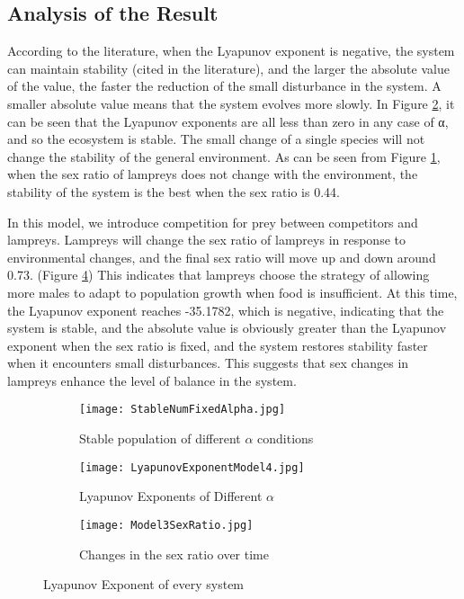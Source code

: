 \documentclass[12pt]{article}  %
\begin{document}
\subsection{Analysis of the Result}
According to the literature, when the Lyapunov exponent is negative, the system can maintain stability (cited in the literature), and the larger the absolute value of the value, the faster the reduction of the small disturbance in the system. A smaller absolute value means that the system evolves more slowly. In Figure \ref{LyapunovExponentModel4}, it can be seen that the Lyapunov exponents are all less than zero in any case of α, and so the ecosystem is stable. The small change of a single species will not change the stability of the general environment. As can be seen from Figure \ref{StableNumFixedAlpha}, when the sex ratio of lampreys does not change with the environment, the stability of the system is the best when the sex ratio is 0.44.

In this model, we introduce competition for prey between competitors and lampreys. Lampreys will change the sex ratio of lampreys in response to environmental changes, and the final sex ratio will move up and down around 0.73. (Figure \ref{Model3SexRatio}) This indicates that lampreys choose the strategy of allowing more males to adapt to population growth when food is insufficient. At this time, the Lyapunov exponent reaches -35.1782, which is negative, indicating that the system is stable, and the absolute value is obviously greater than the Lyapunov exponent when the sex ratio is fixed, and the system restores stability faster when it encounters small disturbances. This suggests that sex changes in lampreys enhance the level of balance in the system.

\begin{figure}[htbp]
	\centering
	\begin{subfigure}[b]{.31\textwidth}
		\texttt{[image: StableNumFixedAlpha.jpg]}
		\caption{\centering Stable population of different $\alpha$ conditions}\label{StableNumFixedAlpha}
	\end{subfigure}
	\begin{subfigure}[b]{.3\textwidth}
		\texttt{[image: LyapunovExponentModel4.jpg]}
		\caption{\centering Lyapunov Exponents of Different $\alpha$}\label{LyapunovExponentModel4}
	\end{subfigure}
		\begin{subfigure}[b]{.3\textwidth}
		\texttt{[image: Model3SexRatio.jpg]}
		\caption{\centering Changes in the sex ratio over time}\label{Model3SexRatio}
	\end{subfigure}
	\caption{Lyapunov Exponent of every system}
\end{figure}
\end{document}
